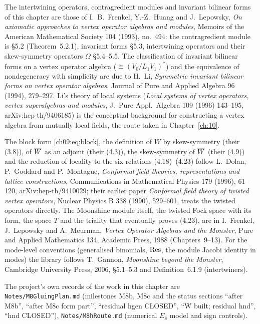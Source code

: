 The intertwining operators, contragredient modules and invariant bilinear forms of this chapter are
those of I.~B.~Frenkel, Y.-Z.~Huang and J.~Lepowsky, \emph{On axiomatic approaches to vertex operator
algebras and modules}, Memoirs of the American Mathematical Society 104 (1993), no.~494: the
contragredient module is \S5.2 (Theorem~5.2.1), invariant forms \S5.3, intertwining operators and
their skew-symmetry operators $\Omega$ \S5.4--5.5. The classification of invariant bilinear forms on
a vertex operator algebra ($\cong(V_0/L_1V_1)^*$) and the equivalence of nondegeneracy with
simplicity are due to H.~Li, \emph{Symmetric invariant bilinear forms on vertex operator algebras},
Journal of Pure and Applied Algebra 96 (1994), 279--297. Li's theory of local systems
(\emph{Local systems of vertex operators, vertex superalgebras and modules}, J.\ Pure Appl.\ Algebra
109 (1996) 143--195, arXiv:hep-th/9406185) is the conceptual background for constructing a vertex
algebra from mutually local fields, the route taken in Chapter~\ref{ch:10}.

The block form \eqref{ch09:eq:block}, the definition of $W$ by skew-symmetry (their (3.8)), of
$\overline{W}$ as an adjoint (their (4.3)), the skew-symmetry of $\overline{W}$ (their (4.9)) and the
reduction of locality to the six relations (4.18)--(4.23) follow L.~Dolan, P.~Goddard and
P.~Montague, \emph{Conformal field theories, representations and lattice constructions},
Communications in Mathematical Physics 179 (1996), 61--120, arXiv:hep-th/9410029; their earlier paper
\emph{Conformal field theory of twisted vertex operators}, Nuclear Physics B 338 (1990), 529--601,
treats the twisted operators directly. The Moonshine module itself, the twisted Fock space with its
form, the space $T$ and the triality that eventually proves (4.23), are in I.~Frenkel, J.~Lepowsky and
A.~Meurman, \emph{Vertex Operator Algebras and the Monster}, Pure and Applied Mathematics 134,
Academic Press, 1988 (Chapters~9--13). For the mode-level conventions (generalised binomials,
$\operatorname{Res}$, the module Jacobi identity in modes) the library follows T.~Gannon, \emph{Moonshine beyond
the Monster}, Cambridge University Press, 2006, \S5.1--5.3 and Definition~6.1.9 (intertwiners).

The project's own records of the work in this chapter are \texttt{Notes/M8GluingPlan.md}
(milestones M8b, M8c and the status sections ``after M8b'', ``after M8c form part'', ``residual hgen
CLOSED'', ``W̄ built; residual hnd'', ``hnd CLOSED''), \texttt{Notes/M8hRoute.md} (numerical
$E_8$ model and sign controls).
